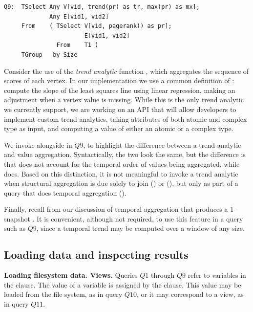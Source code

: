 \begin{small}
\begin{verbatim}
Q9:  TSelect Any V[vid, trend(pr) as tr, max(pr) as mx];
             Any E[vid1, vid2]  
     From    ( TSelect V[vid, pagerank() as pr];   
                       E[vid1, vid2]
               From    T1 )
     TGroup   by Size
\end{verbatim}
\end{small}

Consider the use of the {\em trend analytic} function
, which aggregates the sequence of 
scores of each vertex.  In our implementation we use a common
definition of : compute the slope of the least squares
line using linear regression, making an adjustment when a vertex value
is missing.  While this is the only trend analytic we currently
support, we are working on an API that will allow developers to
implement custom trend analytics, taking attributes of both atomic and
complex type as input, and computing a value of either an atomic or a
complex type.

We invoke  alongside  in $Q9$, to
highlight the difference between a trend analytic and value
aggregation.  Syntactically, the two look the same, but the difference
is that  does not account for the temporal order of
values being aggregated, while  does.  Based on this
distinction, it is not meaningful to invoke a trend analytic when
structural aggregation is due solely to join () or 
(), but only as part of a query that does temporal
aggregation ().

Finally, recall from our discussion of temporal aggregation that
 produces a 1-snapshot \tg.  It is convenient,
although not required, to use this feature in a query such as $Q9$,
since a temporal trend may be computed over a window of any size.

\subsection{Loading data and inspecting results}
\label{sec:example:loadshow}

{\bf Loading filesystem data.  Views.}  Queries $Q1$ through $Q9$
refer to \tg variables in the  clause.  The value of a \tg
variable is assigned by the  clause.  This value may be
loaded from the file system, as in query $Q10$, or it may correspond to
a view, as in query $Q11$.

